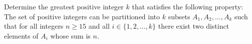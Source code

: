 Determine the greatest positive integer $k$ that satisfies the following property: The set of positive integers can be partitioned into $k$ subsets $A_1, A_2, \ldots, A_k$ such that for all integers $n \geq 15$ and all $i \in \{1, 2, \ldots, k\}$ there exist two distinct elements of $A_i$ whose sum is $n$.
